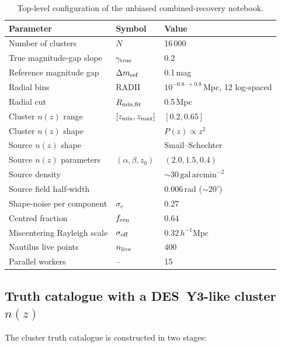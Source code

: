 \documentclass[11pt,a4paper]{article}
\newcommand{\sigmaoff}{\sigma_{\rm off}}
\newcommand{\fcen}{f_{\rm cen}}
\newcommand{\dm}{\Delta m}
\newcommand{\Rmin}{R_{\rm min,fit}}
\begin{document}
\begin{table}[h]
\centering
\begin{tabular}{lll}
\toprule
Parameter & Symbol & Value \\
\midrule
Number of clusters             & $N$               & 16\,000 \\
True magnitude-gap slope       & $\gamma_{\rm true}$ & 0.2 \\
Reference magnitude gap        & $\dm_{\rm ref}$     & 0.1\,mag \\
Radial bins                    & RADII             & $10^{-0.8\text{--}+0.8}$\,Mpc, 12 log-spaced \\
Radial cut                     & $\Rmin$           & 0.5\,Mpc \\
\midrule
Cluster $n(z)$ range           & $[z_{\rm min}, z_{\rm max}]$ & $[0.2, 0.65]$ \\
Cluster $n(z)$ shape           &                   & $P(z) \propto z^2$ \\
Source $n(z)$ shape            &                   & Smail--Schechter \\
Source $n(z)$ parameters       & $(\alpha, \beta, z_0)$ & $(2.0, 1.5, 0.4)$ \\
Source density                 &                   & $\sim\!30\,\mathrm{gal\,arcmin}^{-2}$ \\
Source field half-width        &                   & 0.006\,rad ($\sim\!20'$) \\
Shape-noise per component      & $\sigma_e$        & 0.27 \\
\midrule
Centred fraction               & $\fcen$           & 0.64 \\
Miscentering Rayleigh scale    & $\sigmaoff$       & $0.32\,h^{-1}\mathrm{Mpc}$ \\
\midrule
Nautilus live points           & $n_{\rm live}$    & 400 \\
Parallel workers               & --                & 15 \\
\bottomrule
\end{tabular}
\caption{Top-level configuration of the unbiased combined-recovery notebook.}
\label{tab:params}
\end{table}

\subsection{Truth catalogue with a DES~Y3-like cluster $n(z)$}

The cluster truth catalogue is constructed in two stages:
\end{document}
